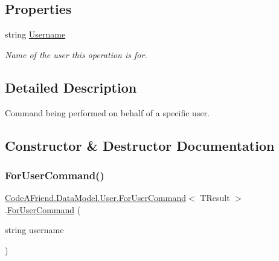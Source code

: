 \subsection*{Properties}
\begin{DoxyCompactItemize}
\item 
string \mbox{\hyperlink{class_code_a_friend_1_1_data_model_1_1_user_1_1_for_user_command_a2c7fef551c3661f0bc712733d1b1380d}{Username}}
\begin{DoxyCompactList}\small\item\em Name of the user this operation is for.\end{DoxyCompactList}\end{DoxyCompactItemize}


\subsection{Detailed Description}
Command being performed on behalf of a specific user.



\subsection{Constructor \& Destructor Documentation}
\mbox{\label{class_code_a_friend_1_1_data_model_1_1_user_1_1_for_user_command_ae8e4225f2733cef42a531d4a30ba1b3e}} 
\subsubsection{\texorpdfstring{For\+User\+Command()}{ForUserCommand()}}
{\footnotesize\ttfamily \mbox{\hyperlink{class_code_a_friend_1_1_data_model_1_1_user_1_1_for_user_command}{Code\+A\+Friend.\+Data\+Model.\+User.\+For\+User\+Command}}$<$ T\+Result $>$.\mbox{\hyperlink{class_code_a_friend_1_1_data_model_1_1_user_1_1_for_user_command}{For\+User\+Command}} (\begin{DoxyParamCaption}\item[{string}]{username }\end{DoxyParamCaption})\hspace{0.3cm}{\ttfamily [protected]}}



